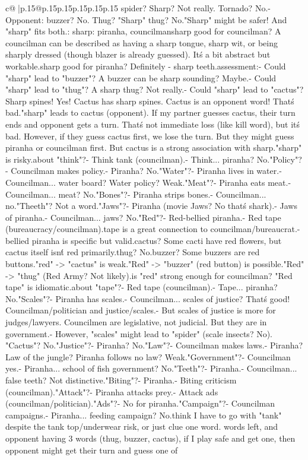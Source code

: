 \documentclass{article}
\begin{document}
{\begin{supertabular}{c@{$\;$}|p{.15\linewidth}@{}p{.15\linewidth}p{.15\linewidth}p{.15\linewidth}p{.15\linewidth}p{.15\linewidth}}
{{{spider? Sharp? Not really. Tornado? No.\n- Opponent: buzzer? No. Thug? "Sharp" thug? No.\n"Sharp" might be safer! And "sharp" fits both.\n\nCLUE: sharp\nTARGETS: piranha, councilman\n\nIs sharp good for councilman? A councilman can be described as having a sharp tongue, sharp wit, or being sharply dressed (though blazer is already guessed). It\'s a bit abstract but workable.\n\nIs sharp good for piranha? Definitely - sharp teeth.\n\nRisk assessment:\n- Could "sharp" lead to "buzzer"? A buzzer can be sharp sounding? Maybe.\n- Could "sharp" lead to "thug"? A sharp thug? Not really.\n- Could "sharp" lead to "cactus"? Sharp spines! Yes! Cactus has sharp spines. Cactus is an opponent word! That\'s bad.\n\nSo "sharp" leads to cactus (opponent). If my partner guesses cactus, their turn ends and opponent gets a turn. That\'s not immediate loss (like kill word), but it\'s bad. However, if they guess cactus first, we lose the turn. But they might guess piranha or councilman first. But cactus is a strong association with sharp.\n\nSo "sharp" is risky.\n\nWhat about "think"?\n- Think tank (councilman).\n- Think... piranha? No.\n\n"Policy"?\n- Councilman makes policy.\n- Piranha? No.\n\n"Water"?\n- Piranha lives in water.\n- Councilman... water board? Water policy? Weak.\n\n"Meat"?\n- Piranha eats meat.\n- Councilman... meat? No.\n\n"Bones"?\n- Piranha strips bones.\n- Councilman... no.\n\n"Theeth"? Not a word.\n\n"Jaws"?\n- Piranha (movie Jaws? No that\'s shark).\n- Jaws of piranha.\n- Councilman... jaws? No.\n\n"Red"?\n- Red-bellied piranha.\n- Red tape (bureaucracy/councilman).\nRed tape is a great connection to councilman/bureaucrat.\nRed-bellied piranha is specific but valid.\nRed cactus? Some cacti have red flowers, but cactus itself isn\'t red primarily.\nRed thug? No.\nRed buzzer? Some buzzers are red buttons.\n\nBut "red" -> "cactus" is weak.\n"Red" -> "buzzer" (red button) is possible.\n"Red" -> "thug" (Red Army? Not likely).\n\nBut is "red" strong enough for councilman? "Red tape" is idiomatic.\n\nWhat about "tape"?\n- Red tape (councilman).\n- Tape... piranha? No.\n\n"Scales"?\n- Piranha has scales.\n- Councilman... scales of justice? That\'s good! Councilman/politician and justice/scales.\n- But scales of justice is more for judges/lawyers. Councilmen are legislative, not judicial. But they are in government.\n- However, "scales" might lead to "spider" (scale insects? No). "Cactus"? No.\n\n"Justice"?\n- Piranha? No.\n\n"Law"?\n- Councilman makes laws.\n- Piranha? Law of the jungle? Piranha follows no law? Weak.\n\n"Government"?\n- Councilman yes.\n- Piranha... school of fish government? No.\n\n"Teeth"?\n- Piranha.\n- Councilman... false teeth? Not distinctive.\n\n"Biting"?\n- Piranha.\n- Biting criticism (councilman).\n\n"Attack"?\n- Piranha attacks prey.\n- Attack ads (councilman/politician).\n\n"Ads"?\n- No for piranha.\n\n"Campaign"?\n- Councilman campaigns.\n- Piranha... feeding campaign? No.\n\nI think I have to go with "tank" despite the tank top/underwear risk, or just clue one word.\n{} words left, and opponent having 3 words (thug, buzzer, cactus), if I play safe and get one, then opponent might get their turn and guess one of }}}
\end{supertabular}}
\end{document}
